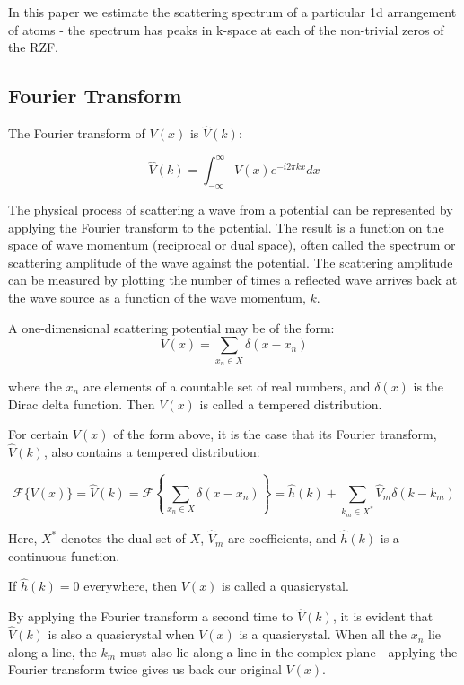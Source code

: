 \documentclass[11pt, oneside]{article}
\begin{document}
In this paper we estimate the scattering spectrum of a particular 1d arrangement of atoms - the spectrum has peaks in k-space at each of the non-trivial zeros of the RZF.  

\subsection{Fourier Transform}
The Fourier transform of $V(x)$ is $\hat{V}(k)$:

\begin{equation}
\hat{V}(k) = \int_{-\infty}^{\infty}V(x)e^{-i2\pi kx}dx
\end{equation}

The physical process of scattering a wave from a potential can be represented by applying the Fourier transform to the potential. The result is a function on the space of wave momentum (reciprocal or dual space), often called the spectrum or scattering amplitude of the wave against the potential. The scattering amplitude can be measured by plotting the number of times a reflected wave arrives back at the wave source as a function of the wave momentum, $k$.

A one-dimensional scattering potential may be of the form:
\begin{equation}
V(x) = \sum_{x_n \in X}\delta(x - x_n)
\end{equation} 
 
where the $x_n$ are elements of a countable set of real numbers, and $\delta(x)$ is the Dirac delta function. Then $V(x)$ is called a tempered distribution.

For certain $V(x)$ of the form above, it is the case that its Fourier transform, $\hat{V}(k)$, also contains a tempered distribution:
  
\begin{equation}
\label{eq:RiemannFourier}
\mathcal{F}\{V(x)\} = \hat{V}(k) = \mathcal{F}\left\{ \sum_{x_n \in X}\delta(x - x_n) \right\} = \hat{h}(k) +  \sum_{k_m \in X^{*}} \hat{V}_{m} \delta(k - k_{m})
\end{equation}

Here, $X^*$ denotes the dual set of $X$, $\hat{V}_{m}$ are coefficients, and $\hat{h}(k)$ is a continuous function.

If $\hat{h}(k) = 0$ everywhere, then $V(x)$ is called a quasicrystal.

By applying the Fourier transform a second time to $\hat{V}(k)$, it is evident that $\hat{V}(k)$ is also a quasicrystal when $V(x)$ is a quasicrystal. When all the $x_n$ lie along a line, the $k_m$ must also lie along a line in the complex plane---applying the Fourier transform twice gives us back our original $V(x)$.
\end{document}
